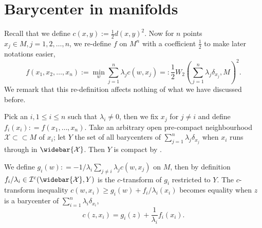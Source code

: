 \section{Barycenter in manifolds}

\label{section:barycenter_manifold}
Recall that we define $c(x, y):=\frac{1}{2} d(x, y)^2$.
Now for $n$ points $x_j \in M, j=1,2,\ldots,n$, we re-define $f$ on $M^n$ with a coefficient $\frac{1}{2}$
to make later notations easier,
\[
	f(x_1, x_2, \ldots, x_n) := \min_{w} \sum_{j=1}^n \lambda_j c(w, x_j) =: \frac{1}{2}W_2(\sum_{j=1}^n \lambda_j \delta_{x_j}, M)^2.
\]
We remark that this re-definition affects nothing of what we have discussed before.

Pick an $i, 1 \leq i \leq n$ such that $\lambda_i \neq 0$, then we fix $x_j$ for $j \neq i$ and
define $f_i (x_i) : = f(x_1, \ldots, x_n)$.
Take an arbitrary open pre-compact neighbourhood $\mathcal{X} \subset \subset M$ of $x_i$;
let $Y$ the set of all barycenters of $\sum_{j=1}^n \lambda_j \delta_{x_j}$
when $x_i$ runs through in $\widebar{ \mathcal{X} }$.
Then $Y$ is compact by .

We define $g_i(w): = - 1/ \lambda_i \sum_{j \neq i} \lambda_j c(w, x_j) $ on $M$,
then by definition $f_i /\lambda_i \in \mathcal{I}^c (\widebar{ \mathcal{X}}, Y)$
is the $c$-transform of
$g_i$ restricted to $Y$.
The $c$-transform inequality
$ c(w, x_i) \geq g_i(w) + f_i / \lambda_i (x_i)$
becomes equality when $z$ is a barycenter of $\sum_{i=1}^{n} \lambda_i \delta_{x_i}$,
\begin{equation}
	\label{equa:g_i_conjugate}
	c(z, x_i) = g_i(z) + \frac{1}{\lambda_i} f_i(x_i).
\end{equation}

